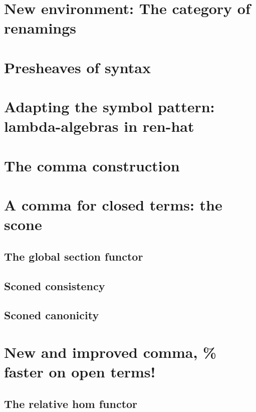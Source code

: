 \documentclass[12pt,twoside]{reedthesis}
\theoremstyle{definition}
\theoremstyle{remark}
\theoremstyle{plain}
\begin{document}
\section{New environment: The category of renamings}
\section{Presheaves of syntax}
\section{Adapting the symbol pattern: lambda-algebras in ren-hat}

\section{The comma construction} %
\section{A comma for closed terms: the scone} %
\subsection{The global section functor}
\subsection{Sconed consistency} %
\subsection{Sconed canonicity} %

\section{New and improved comma, \infty\% faster on open terms!}
\subsection{The relative hom functor}
\end{document}
